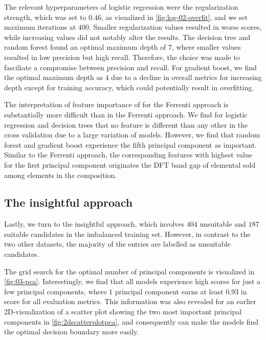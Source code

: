 The relevant hyperparameters of logistic regression were the regularization strength, which was set to $0.46$, as visualized in \autoref{fig:log-02-overfit}, and we set maximum iterations at $400$. Smaller regularization values resulted in worse scores, while increasing values did not notably alter the results. The decision tree and random forest found an optimal maximum depth of $7$, where smaller values resulted in low precision but high recall. Therefore, the choice was made to fasciliate a compromise between precision and recall. For gradient boost, we find the optimal maximum depth as $4$ due to a decline in overall metrics for increasing depth except for training accuracy, which could potentially result in overfitting.


The interpretation of feature importance of for the Ferrenti approach is substantially more difficult than in the Ferrenti approach. We find for logistic regression and decision trees that no feature is different than any other in the cross validation due to a large variation of models. However, we find that random forest and gradient boost experience the fifth principal component as important. Similar to the Ferrenti approach, the corresponding features with highest value for the first principal component originates the DFT band gap of elemental sold among elements in the composition.

\subsection{The insightful approach}

Lastly, we turn to the insightful approach, which involves $404$ unsuitable and $187$ suitable candidates in the imbalanced training set. However, in contrast to the two other datasets, the majority of the entries are labelled as unsuitable candidates.

The grid search for the optimal number of principal components is visualized in \autoref{fig:03-pca}. Interestingly, we find that all models experience high scores for just a few principal components, where $1$ principal component earns at least $0.93$ in score for all evaluation metrics. This information was also revealed for an earlier 2D-visualization of a scatter plot showing the two most important principal components in \autoref{fig:2dscatterplotpca}, and consequently can make the models find the optimal decision boundary more easily.

